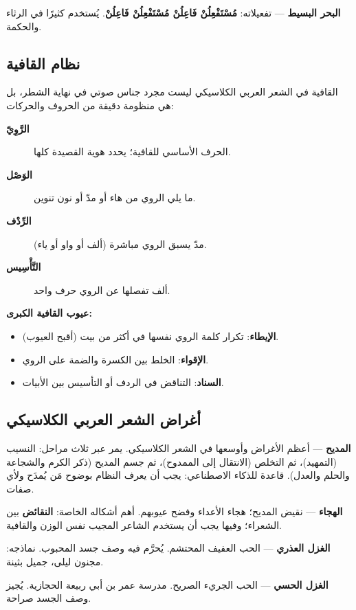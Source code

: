 \begin{otherlanguage}{arabic}
\textbf{البحر البسيط} — تفعيلاته: \textbf{مُسْتَفْعِلُنْ فَاعِلُنْ مُسْتَفْعِلُنْ فَاعِلُنْ}. يُستخدم كثيرًا في الرثاء والحكمة.

\subsection*{نظام القافية}

القافية في الشعر العربي الكلاسيكي ليست مجرد جناس صوتي في نهاية الشطر، بل هي منظومة دقيقة من الحروف والحركات:

\begin{description}
  \item[\textbf{الرَّوِيّ}] الحرف الأساسي للقافية؛ يحدد هوية القصيدة كلها.
  \item[\textbf{الوَصْل}] ما يلي الروي من هاء أو مدّ أو نون تنوين.
  \item[\textbf{الرِّدْف}] مدّ يسبق الروي مباشرة (ألف أو واو أو ياء).
  \item[\textbf{التَّأْسِيس}] ألف تفصلها عن الروي حرف واحد.
\end{description}

\textbf{عيوب القافية الكبرى:}
\begin{itemize}
  \item \textbf{الإيطاء}: تكرار كلمة الروي نفسها في أكثر من بيت (أقبح العيوب).
  \item \textbf{الإقواء}: الخلط بين الكسرة والضمة على الروي.
  \item \textbf{السناد}: التناقض في الردف أو التأسيس بين الأبيات.
\end{itemize}

\subsection*{أغراض الشعر العربي الكلاسيكي}

\textbf{المديح} — أعظم الأغراض وأوسعها في الشعر الكلاسيكي. يمر عبر ثلاث مراحل: النسيب (التمهيد)، ثم التخلص (الانتقال إلى الممدوح)، ثم جسم المديح (ذكر الكرم والشجاعة والحلم والعدل). قاعدة للذكاء الاصطناعي: يجب أن يعرف النظام بوضوح مَن يُمدَح ولأي صفات.

\textbf{الهجاء} — نقيض المديح؛ هجاء الأعداء وفضح عيوبهم. أهم أشكاله الخاصة: \textbf{النقائض} بين الشعراء؛ وفيها يجب أن يستخدم الشاعر المجيب نفس الوزن والقافية.

\textbf{الغزل العذري} — الحب العفيف المحتشم. يُحرَّم فيه وصف جسد المحبوب. نماذجه: مجنون ليلى، جميل بثينة.

\textbf{الغزل الحسي} — الحب الجريء الصريح. مدرسة عمر بن أبي ربيعة الحجازية. يُجيز وصف الجسد صراحة.


\end{otherlanguage}
